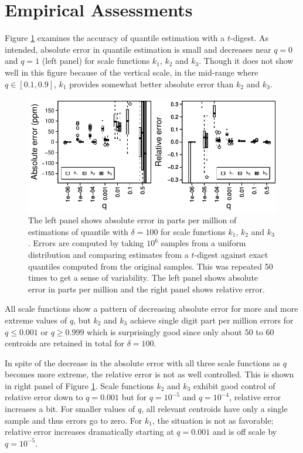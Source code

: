 \documentclass[]{statsoc}
\begin{document}
\section{Empirical Assessments}
Figure \ref{fig:by-scale} examines the accuracy of quantile estimation with a $t$-digest.  As intended, absolute error in quantile estimation is small and decreases near $q=0$ and $q=1$ (left panel) for scale functions $k_1$, $k_2$ and $k_3$. Though it does not show well in this figure because of the vertical scale, in the mid-range where $q \in [0.1, 0.9]$, $k_1$ provides somewhat better absolute error than $k_2$ and $k_3$. 
\begin{figure}[htb] %
   \includegraphics[width=5.5in]{relative-error.pdf} 
   \caption{The left panel shows absolute error in parts per million of estimations of quantile with $\delta = 100$ for scale functions $k_1$, $k_2$ and $k_3$. Errors are computed by taking $10^6$ samples from a uniform distribution and comparing estimates from a $t$-digest against exact quantiles computed from the original samples. This was repeated 50 times to get a sense of variability. The left panel shows absolute error in parts per million and the right panel shows relative error.}
   \label{fig:by-scale}
\end{figure}

All scale functions show a pattern of decreasing absolute error for more and more extreme values of $q$, but $k_2$ and $k_3$ achieve single digit part per million errors for $q\le 0.001$ or $q\ge0.999$ which is surprisingly good since only about 50 to 60 centroids are retained in total for $\delta=100$. 

In spite of the decrease in the absolute error with all three scale functions as $q$ becomes more extreme, the relative error is not as well controlled. This is shown in right panel of Figure \ref{fig:by-scale}. Scale functions $k_2$ and $k_3$ exhibit good control of relative error down to $q=0.001$ but for $q= 10^{-5}$ and $q=10^{-4}$, relative error increases a bit. For  smaller values of $q$, all relevant centroids have only a single sample and thus errors go to zero. For $k_1$, the situation is not as favorable; relative error increases dramatically starting at $q=0.001$ and is off scale by $q=10^{-5}$.
\end{document}
